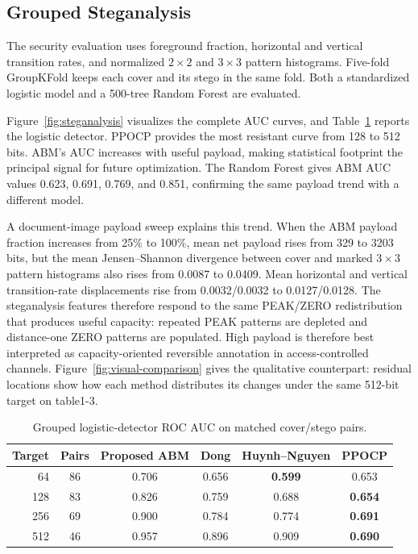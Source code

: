 \documentclass[a4paper,fleqn]{cas-dc}
\newcommand{\RevisionAddBegin}{\begingroup}
\newcommand{\RevisionAddEnd}{\endgroup}
\newcommand{\RevisionAddBegin}{\begingroup\color{revisionblue}}
\newcommand{\RevisionAddEnd}{\endgroup}
\begin{document}
\subsection{Grouped Steganalysis}
\label{subsec:steganalysis}

The security evaluation uses foreground fraction, horizontal and vertical
transition rates, and normalized $2\times2$ and $3\times3$ pattern histograms.
Five-fold GroupKFold keeps each cover and its stego in the same fold. Both a
standardized logistic model and a 500-tree Random Forest are evaluated.

Figure~\ref{fig:steganalysis} visualizes the complete AUC curves, and
Table~\ref{tab:steganalysis} reports the logistic detector. PPOCP provides the
\RevisionAddBegin
most resistant curve from 128 to 512 bits. ABM's AUC increases with useful
payload, making statistical footprint the principal signal for future
optimization. The Random Forest gives ABM AUC values 0.623, 0.691,
\RevisionAddEnd
0.769, and 0.851, confirming the same payload trend with a different model.
\RevisionAddBegin

A document-image payload sweep explains this trend. When the ABM payload
fraction increases from 25\% to 100\%, mean net payload rises from 329 to 3203
bits, but the mean Jensen--Shannon divergence between cover and marked
$3\times3$ pattern histograms also rises from 0.0087 to 0.0409. Mean
horizontal and vertical transition-rate displacements rise from
0.0032/0.0032 to 0.0127/0.0128. The steganalysis features therefore respond to
the same PEAK/ZERO redistribution that produces useful capacity: repeated PEAK
patterns are depleted and distance-one ZERO patterns are populated. High
payload is therefore best interpreted as capacity-oriented reversible
annotation in access-controlled channels. Figure~\ref{fig:visual-comparison}
gives the qualitative counterpart: residual locations show how each method
distributes its changes under the same 512-bit target on table1-3.
\RevisionAddEnd

\begin{table}[t]
\centering
\caption{Grouped logistic-detector ROC AUC on matched cover/stego pairs.}
\label{tab:steganalysis}
\begin{tabular}{@{}rccccc@{}}
\toprule
\textbf{Target} & \textbf{Pairs} & \textbf{Proposed ABM} &
\textbf{Dong} & \textbf{Huynh--Nguyen} & \textbf{PPOCP} \\
\midrule
64  & 86 & 0.706 & 0.656 & \textbf{0.599} & 0.653 \\
128 & 83 & 0.826 & 0.759 & 0.688 & \textbf{0.654} \\
256 & 69 & 0.900 & 0.784 & 0.774 & \textbf{0.691} \\
512 & 46 & 0.957 & 0.896 & 0.909 & \textbf{0.690} \\
\bottomrule
\end{tabular}
\end{table}
\end{document}
